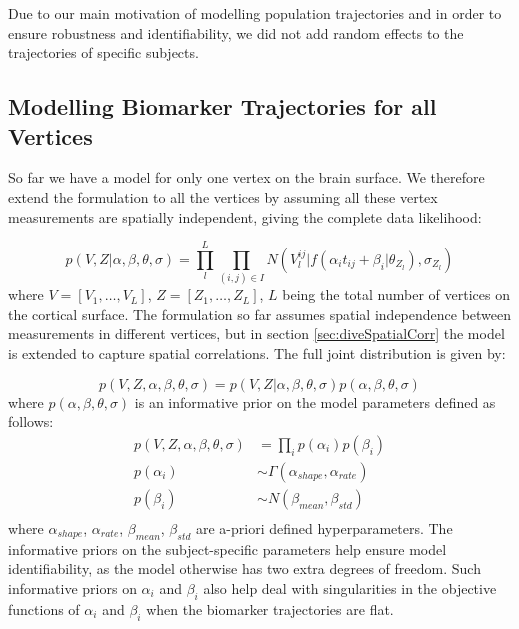 Due to our main motivation of modelling population trajectories and in order to ensure robustness and identifiability, we did not add random effects to the trajectories of specific subjects.

\subsection{Modelling Biomarker Trajectories for all Vertices}

So far we have a model for only one vertex on the brain surface. We therefore extend the formulation to all the vertices by assuming all these vertex measurements are spatially independent, giving the complete data likelihood:

\begin{equation}
\label{eq:dps_vwdpm5}
 p(V, Z | \alpha, \beta, \theta, \sigma) = \prod_l^L \prod_{(i,j) \in I} N(V_l^{ij} | f(\alpha_i t_{ij} + \beta_i | \theta_{Z_l}), \sigma_{Z_l})
\end{equation}
where $V = [V_1, \dots, V_L]$, $Z = [Z_1, \dots, Z_L]$, $L$ being the total number of vertices on the cortical surface. The formulation so far assumes spatial independence between measurements in different vertices, but in section \ref{sec:diveSpatialCorr} the model is extended to capture spatial correlations. The full joint distribution is given by:

\begin{equation} \label{eq21}
  p(V, Z, \alpha, \beta, \theta, \sigma) = p(V, Z | \alpha, \beta, \theta, \sigma) p(\alpha, \beta, \theta, \sigma)
\end{equation}
where $p(\alpha, \beta, \theta, \sigma)$ is an informative prior on the model parameters defined as follows: 
\begin{equation} \label{eq1}
\begin{split}
 p(V, Z, \alpha, \beta, \theta, \sigma) & = \prod_{i} p(\alpha_i) p(\beta_i)\\
 p(\alpha_i) & \sim \Gamma(\alpha_{shape}, \alpha_{rate})\\
 p(\beta_i) & \sim N(\beta_{mean}, \beta_{std})\\
\end{split}
\end{equation}
where $\alpha_{shape}$, $\alpha_{rate}$, $\beta_{mean}$, $\beta_{std}$ are a-priori defined hyperparameters. The informative priors on the subject-specific parameters help ensure model identifiability, as the model otherwise has two extra degrees of freedom. Such informative priors on $\alpha_i$ and $\beta_i$ also help deal with singularities in the objective functions of $\alpha_i$ and $\beta_i$ when the biomarker trajectories are flat.

